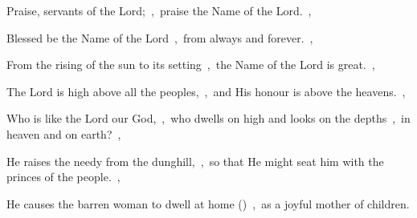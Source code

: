 \documentclass[12pt,twoside,a5paper]{article}
\begin{document}
\begin{normalparskip}
  Praise, servants of the Lord;~\sep\ praise the Name of the Lord.~\sep


  Blessed be the Name of the Lord~\sep\ from always and forever.~\sep

  From the rising of the sun to its setting~\sep\ the Name of the Lord is great.~\sep

  The Lord is high above all the peoples,~\sep\ and His honour is above the heavens.~\sep

  Who is like the Lord our God,~\sep\ who dwells on high and looks on the depths~\sep\ in heaven and on earth?~\sep

  He raises the needy from the dunghill,~\sep\ so that He might seat him with the princes of the people.~\sep

  He causes the barren woman to dwell at home ()~\sep\ as a joyful mother of children.
\end{normalparskip}

\end{document}
